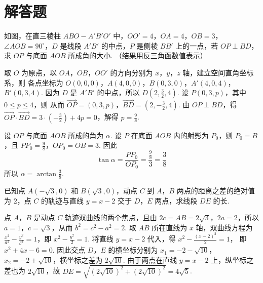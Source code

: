 \section{解答题}
\begin{problem}
如图，在直三棱柱 \(ABO - A'B'O'\) 中，\(OO' = 4\)，\(OA = 4\)，\(OB = 3\)，\(\angle AOB = 90^\circ\)，\(D\) 是线段 \(A'B'\) 的中点，\(P\) 是侧棱 \(BB'\) 上的一点，若 \(OP \perp BD\)，求 \(OP\) 与底面 \(AOB\) 所成角的大小. （结果用反三角函数值表示）

\end{problem}

\begin{solution}
取 \(O\) 为原点，以 \(OA\)，\(OB\)，\(OO'\) 的方向分别为 \(x\)，\(y\)，\(z\) 轴，建立空间直角坐标系，则
各点坐标为 \(O(0,0,0)\)，\(A(4,0,0)\)，\(B(0,3,0)\)，\(A'(4,0,4)\)，\(B'(0,3,4)\).
因为 \(D\) 是 \(A'B'\) 的中点，所以 \(D\left(2,\frac{3}{2},4\right)\). 设 \(P(0,3,p)\)，其中 \(0\leqslant p\leqslant4\)，则
从而 \(\overrightarrow{OP}=(0,3,p)\)，\(\overrightarrow{BD}=\left(2,-\frac{3}{2},4\right)\).
由 \(OP\perp BD\)，得
\(\overrightarrow{OP}\cdot\overrightarrow{BD}=3\cdot\left(-\frac{3}{2}\right)+4p=0\)，解得 \(p=\frac{9}{8}\).

设 \(OP\) 与底面 \(AOB\) 所成的角为 \(\alpha\). 设 \(P\) 在底面 \(AOB\) 内的射影为 \(P_0\)，则 \(P_0=B\)，且 \(PP_0=\frac{9}{8}\)，\(OP_0=OB=3\). 因此
\[
\tan\alpha=\frac{PP_0}{OP_0}=\frac{\frac{9}{8}}{3}=\frac{3}{8}
\]
所以 \(\alpha=\arctan\frac{3}{8}\).
\end{solution}

\begin{problem}
已知点 \(A(-\sqrt{3},0)\) 和 \(B(\sqrt{3},0)\)，动点 \(C\) 到 \(A\)，\(B\) 两点的距离之差的绝对值为 \(2\)，点 \(C\) 的轨迹与直线 \(y = x - 2\) 交于 \(D\)，\(E\) 两点，求线段 \(DE\) 的长.

\end{problem}

\begin{solution}
点 \(A\)，\(B\) 是动点 \(C\) 轨迹双曲线的两个焦点，且由 \(2c=AB=2\sqrt{3}\)，\(2a=2\)，所以 \(a=1\)，\(c=\sqrt{3}\)，从而 \(b^2=c^2-a^2=2\). 取 \(AB\) 所在直线为 \(x\) 轴，双曲线方程为
\(\frac{x^2}{a^2}-\frac{y^2}{b^2}=1\)，即 \(x^2-\frac{y^2}{2}=1\).
将直线 \(y=x-2\) 代入，得
\(x^2-\frac{(x-2)^2}{2}=1\)，
即 \(x^2+4x-6=0\). 因此交点 \(D\)，\(E\) 的横坐标分别为 \(x_1=-2-\sqrt{10}\)，\(x_2=-2+\sqrt{10}\)，横坐标之差为 \(2\sqrt{10}\). 由于两点在直线 \(y=x-2\) 上，纵坐标之差也为 \(2\sqrt{10}\)，故
\(DE=\sqrt{(2\sqrt{10})^2+(2\sqrt{10})^2}=4\sqrt{5}\).
\end{solution}

